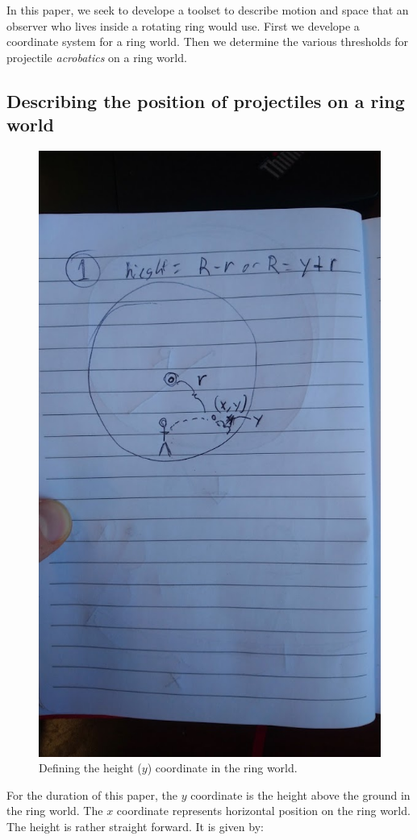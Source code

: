 \documentclass{amsart}
\theoremstyle{definition}
\begin{document}
\newline

In this paper, we seek to develope a toolset to describe motion and space that an observer
 who lives inside a rotating ring would use. First we develope a coordinate system for a ring world. 
 Then we determine the various thresholds for projectile \textit{acrobatics} on a ring world. 

\newpage
\subsection{Describing the position of projectiles on a ring world}

\begin{figure}
  \centering
	\includegraphics[width=0.7\linewidth]{figures/height_fig_rough.JPG}
	\caption{Defining the height ($y$) coordinate in the ring world.}
	\label{fig:vertical}
\end{figure}

For the duration of this paper, the $y$ coordinate is the height above the ground in the ring world.
The $x$ coordinate represents horizontal position on the ring world. 
The height is rather straight forward. It is given by:
\end{document}
